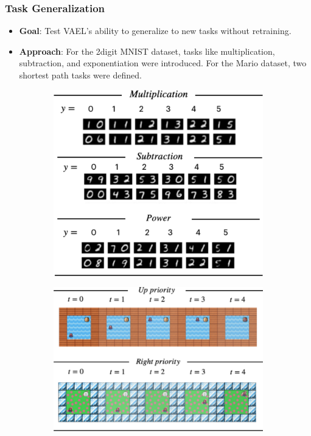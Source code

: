 \documentclass[10pt,xcolor={dvipsnames}]{beamer}
\begin{document}
\begin{frame}[t]
    \frametitle{Task Generalization}
    \begin{itemize}
        \item \textbf{Goal}: Test VAEL’s ability to generalize to new tasks without retraining.
        \item \textbf{Approach}: For the 2digit MNIST dataset, tasks like multiplication, subtraction, and exponentiation were introduced. For the Mario dataset, two shortest path tasks were defined.
    \end{itemize}
    \begin{figure}[htb]
        \centering
        \begin{subfigure}[][0pt][t]{0.45\textwidth}
            \includegraphics[width=\textwidth]{figures/generaliz.png}
        \end{subfigure}
        \hfill
        \begin{subfigure}[][0pt][t]{0.5\textwidth}
            \includegraphics[width=\textwidth]{figures/generaliz2.png}
        \end{subfigure}
    \end{figure}
\end{frame}
\end{document}
